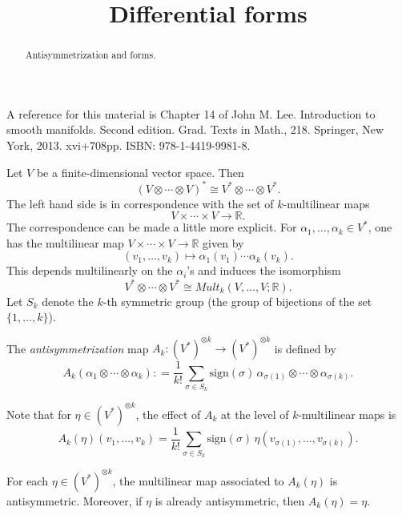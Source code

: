 \documentclass{ximera}
\title{Differential forms}
\begin{document}
    \begin{abstract} Antisymmetrization and forms.   \end{abstract}
    \maketitle

    A reference for this material is Chapter 14 of John M. Lee. Introduction to smooth manifolds. Second edition. Grad. Texts in Math., 218. Springer, New York, 2013. xvi+708pp. ISBN: 978-1-4419-9981-8.

    Let $V$ be a finite-dimensional vector space. Then 
    \[      (V \otimes \cdots \otimes V ) ^{\ast} \cong V^{\ast} \otimes \cdots \otimes V^{\ast} .                 \]
    The left hand side is in correspondence with the set of $k$-multilinear maps
    \[   V \times \cdots \times V \to \mathbb{R} . \]
    The correspondence can be made a little more explicit. For $\alpha _1 , \ldots , \alpha _k \in V^{\ast}$, one has the multilinear map $V \times \cdots \times V \to \mathbb{R} $ given by
    \[     (v_1, \ldots , v_k) \mapsto \alpha _1 (v_1) \cdots \alpha _k (v_k) .                  \]
    This depends multilinearly on the $\alpha _i$'s and induces the isomorphism 
    \[    V^{\ast} \otimes \cdots \otimes V^{\ast} \cong    Mult_k (V , \ldots , V ; \mathbb{R} ).     \]
    Let $S_k$ denote the $k$-th symmetric group (the group of bijections of the set $\{ 1, \ldots , k \}$).
    \begin{definition}
        The \emph{antisymmetrization} map $A_k : (V^{\ast} )^{\otimes k} \to (V^{\ast} ) ^{\otimes k } $ is defined by
        \[     A_k ( \alpha _1 \otimes \cdots \otimes \alpha _k  ) : = \frac{1}{k!} \sum _{\sigma \in S_k } \text{sign}  (\sigma)  \, \alpha _{\sigma (1) } \otimes \cdots \otimes \alpha _{\sigma (k)}  .        \]
    \end{definition}
    Note that for  $\eta \in (V^{\ast} )^{\otimes k}$, the effect of $A_k$ at the level of $k$-multilinear maps is
    \begin{equation}\label{eq:antisymmetrization}
         A_k (\eta) (v_1, \ldots , v_k) = \frac{1}{k!} \sum_{\sigma \in S_k } \text{sign} (\sigma)  \, \eta ( v_{\sigma (1)} , \ldots , v_{\sigma (k) } ).                        
    \end{equation}
    \begin{proposition}
        For each $ \eta  \in (V^{\ast} ) ^{\otimes k}$, the multilinear map associated to $A_k (\eta)$ is antisymmetric. Moreover, if $\eta$ is already antisymmetric, then $A_k (\eta) = \eta$. 
    \end{proposition}
\end{document}

